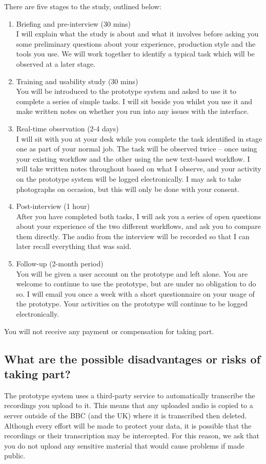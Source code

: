 There are five stages to the study, outlined below:
\begin{enumerate}
\item Briefing and pre-interview (30 mins)\\
I will explain what the study is about and what it involves before asking you
some preliminary questions about your experience, production style and the
tools you use. We will work together to identify a typical task which will be
observed at a later stage.
\item Training and usability study (30 mins)\\
You will be introduced to the prototype system and asked to use it to complete
a series of simple tasks. I will sit beside you whilst you use it and make
written notes on whether you run into any issues with the interface.
\item Real-time observation (2-4 days)\\
I will sit with you at your desk while you complete the task identified in
stage one as part of your normal job. The task will be observed twice – once
using your existing workflow and the other using the new text-based workflow. I
will take written notes throughout based on what I observe, and your activity
on the prototype system will be logged electronically. I may ask to take
photographs on occasion, but this will only be done with your consent.
\item Post-interview (1 hour)\\
After you have completed both tasks, I will ask you a series of open questions
about your experience of the two different workflows, and ask you to compare
them directly. The audio from the interview will be recorded so that I can
later recall everything that was said.
\item Follow-up (2-month period)\\
You will be given a user account on the prototype and left alone. You are
welcome to continue to use the prototype, but are under no obligation to do so.
I will email you once a week with a short questionnaire on your usage of the
prototype. Your activities on the prototype will continue to be logged
electronically.
\end{enumerate}

You will not receive any payment or compensation for taking part.

\subsection{What are the possible disadvantages or risks of taking part?}
The prototype system uses a third-party service to automatically transcribe the
recordings you upload to it. This means that any uploaded audio is copied to a
server outside of the BBC (and the UK) where it is transcribed then deleted.
Although every effort will be made to protect your data, it is possible that
the recordings or their transcription may be intercepted. For this reason, we
ask that you do not upload any sensitive material that would cause problems if
made public.

